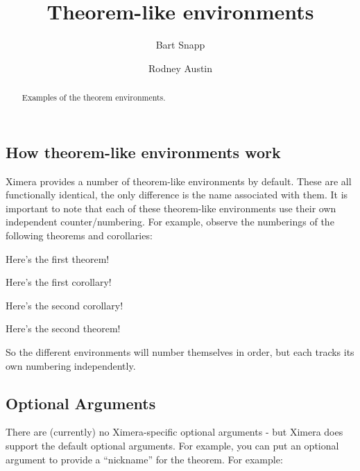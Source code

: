 \documentclass{ximera}
\author{Bart Snapp \and Rodney Austin}
\title{Theorem-like environments}
\begin{document}
\begin{abstract}
  Examples of the theorem environments.
\end{abstract}
\maketitle

    \subsection*{How theorem-like environments work}
        Ximera provides a number of theorem-like environments by default. These are all functionally identical, the only difference is the name associated with them. It is important to note that each of these theorem-like environments use their own independent counter/numbering. For example, observe the numberings of the following theorems and corollaries:
        
        \begin{theorem}
            Here's the first theorem!
        \end{theorem}
        
        \begin{corollary}
            Here's the first corollary!
        \end{corollary}
    
        \begin{corollary}
            Here's the second corollary!
        \end{corollary}
    
        \begin{theorem}
            Here's the second theorem!
        \end{theorem}
        
        So the different environments will number themselves in order, but each tracks its own numbering independently.

    \subsection*{Optional Arguments}
        
        There are (currently) no Ximera-specific optional arguments - but Ximera does support the default optional arguments. For example, you can put an optional argument to provide a ``nickname'' for the theorem. For example:
        
\end{document}
